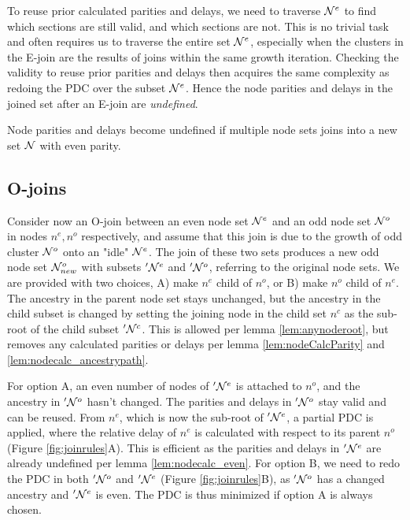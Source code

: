 To reuse prior calculated parities and delays, we need to traverse $\mathcal{N}^e$ to find which sections are still valid, and which sections are not. This is no trivial task and often requires us to traverse the entire set $\mathcal{N}^e$, especially when the clusters in the E-join are the results of joins within the same growth iteration.  Checking the validity to reuse prior parities and delays then acquires the same complexity as redoing the PDC over the subset $\mathcal{N}^e$. Hence the node parities and delays in the joined set after an E-join are \emph{undefined}.

\begin{lemma}\label{lem:nodecalc_even}
  Node parities and delays become undefined if multiple node sets joins into a new set $\mathcal{N}$ with even parity.
\end{lemma}

\subsection{O-joins}

Consider now an O-join between an even node set $\mathcal{N}^e$ and an odd node set $\mathcal{N}^o$ in nodes $n^e, n^o$ respectively, and assume that this join is due to the growth of odd cluster $\mathcal{N}^o$ onto an "idle" $\mathcal{N}^e$. The join of these two sets produces a new odd node set $\mathcal{N}_{new}^o$ with subsets $'\mathcal{N}^e$ and $'\mathcal{N}^o$, referring to the original node sets. We are provided with two choices, A) make $n^e$ child of $n^o$, or B) make $n^o$ child of $n^e$. The ancestry in the parent node set stays unchanged, but the ancestry in the child subset is changed by setting the joining node in the child set $n^c$ as the sub-root of the child subset $'\mathcal{N}^c$. This is allowed per lemma \ref{lem:anynoderoot}, but removes any calculated parities or delays per lemma \ref{lem:nodeCalcParity} and \ref{lem:nodecalc_ancestrypath}.

For option A, an even number of nodes of $'\mathcal{N}^e$ is attached to $n^o$, and the ancestry in $'\mathcal{N}^o$ hasn't changed. The parities and delays in $'\mathcal{N}^o$ stay valid and can be reused. From $n^e$, which is now the sub-root of  $'\mathcal{N}^e$, a partial PDC is applied, where the relative delay of $n^e$ is calculated with respect to its parent $n^o$ (Figure \ref{fig:joinrules}A). This is efficient as the parities and delays in $'\mathcal{N}^e$ are already undefined per lemma \ref{lem:nodecalc_even}. For option B, we need to redo the PDC in both $'\mathcal{N}^o$ and $'\mathcal{N}^e$ (Figure \ref{fig:joinrules}B), as $'\mathcal{N}^o$ has a changed ancestry and  $'\mathcal{N}^e$ is even. The PDC is thus minimized if option A is always chosen. \\

